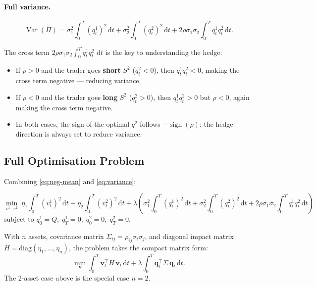 \documentclass[12pt, a4paper]{article}
\newcommand{\Var}{\operatorname{Var}}
\newcommand{\dd}{\,\mathrm{d}}
\begin{document}
\paragraph{Full variance.}
\begin{equation}
  \Var(\Pi)
  = \sigma_1^2\int_0^T (q^1_t)^2 \dd t
  + \sigma_2^2\int_0^T (q^2_t)^2 \dd t
  + 2\rho\sigma_1\sigma_2\int_0^T q^1_t q^2_t \dd t.
  \label{eq:variance}
\end{equation}

\begin{keybox}
  The cross term $2\rho\sigma_1\sigma_2\int_0^T q^1_t q^2_t\,\dd t$ is the key
  to understanding the hedge:
  \begin{itemize}[leftmargin=1.5em]
    \item If $\rho > 0$ and the trader goes \textbf{short} $S^2$ ($q^2_t < 0$),
          then $q^1_t q^2_t < 0$, making the cross term negative — reducing variance.
    \item If $\rho < 0$ and the trader goes \textbf{long} $S^2$ ($q^2_t > 0$),
          then $q^1_t q^2_t > 0$ but $\rho < 0$, again making the cross term negative.
    \item In both cases, the sign of the optimal $q^2$ follows $-\operatorname{sign}(\rho)$:
          the hedge direction is always set to reduce variance.
  \end{itemize}
\end{keybox}

\subsection{Full Optimisation Problem}

Combining \eqref{eq:neg-mean} and \eqref{eq:variance}:

\begin{resultbox}
\[
  \min_{v^1,\,v^2}\;
  \eta_1\int_0^T (v^1_t)^2 \dd t
  + \eta_2\int_0^T (v^2_t)^2 \dd t
  + \lambda\!\left(
      \sigma_1^2\int_0^T (q^1_t)^2 \dd t
      + \sigma_2^2\int_0^T (q^2_t)^2 \dd t
      + 2\rho\sigma_1\sigma_2\int_0^T q^1_t q^2_t \dd t
    \right)
\]
subject to $q^1_0 = Q,\; q^1_T = 0,\; q^2_0 = 0,\; q^2_T = 0$.
\end{resultbox}

\begin{notebox}
  With $n$ assets, covariance matrix $\Sigma_{ij} = \rho_{ij}\sigma_i\sigma_j$,
  and diagonal impact matrix $H = \mathrm{diag}(\eta_1,\ldots,\eta_n)$, the
  problem takes the compact matrix form:
  \[
    \min_{\mathbf{v}}
    \int_0^T \mathbf{v}_t^\top H\,\mathbf{v}_t \dd t
    + \lambda\int_0^T \mathbf{q}_t^\top \Sigma\,\mathbf{q}_t \dd t.
  \]
  The 2-asset case above is the special case $n = 2$.
\end{notebox}
\end{document}
